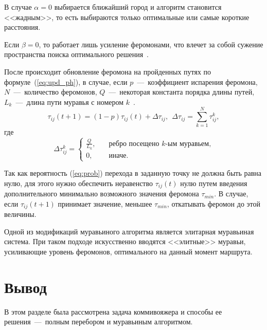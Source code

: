 В случае $\alpha = 0$ выбирается ближайший город и алгоритм становится <<жадным>>, то есть выбираются только оптимальные или самые короткие расстояния.

Если $\beta = 0$, то работает лишь усиление феромонами, что влечет за собой сужение пространства поиска оптимального решения~\cite{shtovba}.

После происходит обновление феромона на пройденных путях по формуле~(\ref{eq:upd_ph}), в случае, если $p$~---~коэффициент испарения феромона, $N$~---~количество феромонов, $Q$~---~некоторая константа порядка длины путей, $L_{k}$~---~длина пути муравья с номером $k$~\cite{shtovba}.
\begin{equation}\label{eq:upd_ph}
	\tau_{ij}(t+1) = (1-p)\tau_{ij}(t) + \Delta \tau_{ij},~~\Delta \tau_{ij} =
	\displaystyle\sum_{k=1}^N \tau^k_{ij},
\end{equation}
где
\begin{equation}\label{eq:3}
	\Delta \tau^k_{ij} = \begin{cases}
		\frac{Q}{L_k}, & \quad \textrm{ребро посещено $k$-ым муравьем,} \\
		0, & \quad \textrm{иначе.}
	\end{cases}
\end{equation}

Так как вероятность (\ref{eq:prob}) перехода в заданную точку не должна быть равна нулю, для этого нужно обеспечить неравенство $\tau_{ij} (t)$ нулю путем введения дополнительного минимально возможного значения феромона $\tau_{min}$.
В случае, если $\tau_{ij} (t+1)$ принимает значение, меньшее $\tau_{min}$, откатывать феромон до этой величины.

Одной из модификаций муравьиного алгоритма является элитарная муравьиная система.
При таком подходе искусственно вводятся <<элитные>> муравьи, усиливающие уровень феромонов, оптимального на данный момент маршрута.

\section*{Вывод}
В этом разделе была рассмотрена задача коммивояжера и способы ее решения~---~полным перебором и муравьиным алгоритмом.
